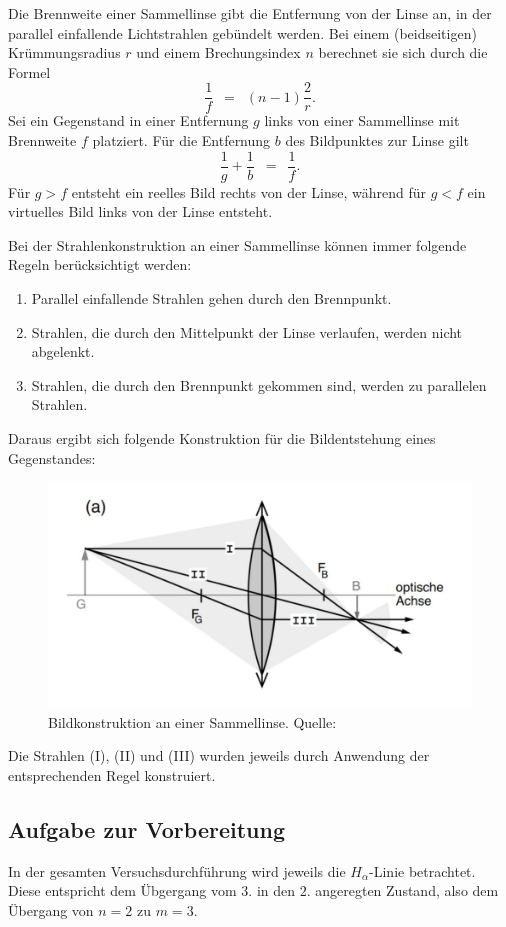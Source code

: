 \documentclass{article}
\newcommand{\widespace}{\enspace}
\newcommand{\wideeq}{\widespace = \widespace}
\begin{document}
Die Brennweite einer Sammellinse gibt die Entfernung von der Linse an,
in der parallel einfallende Lichtstrahlen gebündelt werden. Bei einem
(beidseitigen) Krümmungsradius $r$ und einem Brechungsindex $n$ 
berechnet sie sich durch die Formel
\[
    \frac 1 f \wideeq (n - 1) \frac 2 r.
\]
Sei ein Gegenstand in einer Entfernung $g$ links von einer Sammellinse mit
Brennweite $f$ platziert. Für die Entfernung $b$ des Bildpunktes zur Linse gilt
\[
    \frac 1 g + \frac 1 b \wideeq \frac 1 f.
\]
Für $g > f$ entsteht ein reelles Bild rechts von der Linse, während für
$g < f$ ein virtuelles Bild links von der Linse entsteht.

Bei der Strahlenkonstruktion an einer Sammellinse können immer folgende
Regeln berücksichtigt werden:
\begin{enumerate}[label=(\Roman*)]
    \item Parallel einfallende Strahlen gehen durch den Brennpunkt.
    \item Strahlen, die durch den Mittelpunkt der Linse verlaufen,
    werden nicht abgelenkt.
    \item Strahlen, die durch den Brennpunkt gekommen sind, werden
    zu parallelen Strahlen.
\end{enumerate}
Daraus ergibt sich folgende Konstruktion für die Bildentstehung eines Gegenstandes:

\begin{figure}[H]
    \centering
    \includegraphics[width=0.5\linewidth]{Abbildungen/Sammellinse.jpeg}
    \caption{
        Bildkonstruktion an einer Sammellinse.
        Quelle: \cite[95]{zinth}
    }
\end{figure}

Die Strahlen (I), (II) und (III) wurden jeweils durch Anwendung der entsprechenden
Regel konstruiert.

\cite[86--97]{zinth}


\subsection{Aufgabe zur Vorbereitung}

In der gesamten Versuchsdurchführung wird jeweils die $H_\alpha$-Linie betrachtet.
Diese entspricht dem Übgergang vom $3$. in den $2$. angeregten Zustand, also
dem Übergang von $n = 2$ zu $m = 3$.
\end{document}
